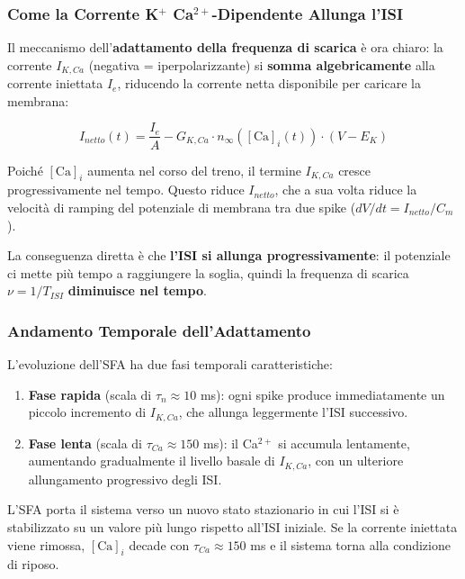 \subsubsection{Come la Corrente K$^+$ Ca$^{2+}$-Dipendente Allunga l'ISI}

Il meccanismo dell'\textbf{adattamento della frequenza di scarica} è ora chiaro: la corrente $I_{K,Ca}$ (negativa = iperpolarizzante) si \textbf{somma algebricamente} alla corrente iniettata $I_e$, riducendo la corrente netta disponibile per caricare la membrana:

\begin{equation}
I_{netto}(t) = \frac{I_e}{A} - G_{K,Ca} \cdot n_\infty([\text{Ca}]_i(t)) \cdot (V - E_K)
\end{equation}

Poiché $[\text{Ca}]_i$ aumenta nel corso del treno, il termine $I_{K,Ca}$ cresce progressivamente nel tempo. Questo riduce $I_{netto}$, che a sua volta riduce la velocità di ramping del potenziale di membrana tra due spike ($dV/dt = I_{netto}/C_m$).

La conseguenza diretta è che \textbf{l'ISI si allunga progressivamente}: il potenziale ci mette più tempo a raggiungere la soglia, quindi la frequenza di scarica $\nu = 1/T_{ISI}$ \textbf{diminuisce nel tempo}.

\subsubsection{Andamento Temporale dell'Adattamento}

L'evoluzione dell'SFA ha due fasi temporali caratteristiche:

\begin{enumerate}
    \item \textbf{Fase rapida} (scala di $\tau_n \approx 10$ ms): ogni spike produce immediatamente un piccolo incremento di $I_{K,Ca}$, che allunga leggermente l'ISI successivo.
    \item \textbf{Fase lenta} (scala di $\tau_{Ca} \approx 150$ ms): il Ca$^{2+}$ si accumula lentamente, aumentando gradualmente il livello basale di $I_{K,Ca}$, con un ulteriore allungamento progressivo degli ISI.
\end{enumerate}

L'SFA porta il sistema verso un nuovo stato stazionario in cui l'ISI si è stabilizzato su un valore più lungo rispetto all'ISI iniziale. Se la corrente iniettata viene rimossa, $[\text{Ca}]_i$ decade con $\tau_{Ca} \approx 150$ ms e il sistema torna alla condizione di riposo.


